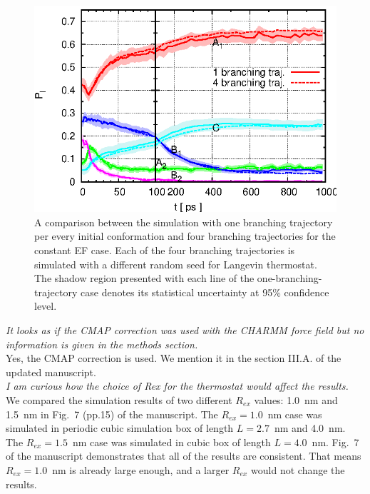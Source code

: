 \documentclass[]{revtex4-1}
\begin{document}
\begin{figure}
  \centering
  \includegraphics{figs/fig-meta-more.eps}
  \caption{A comparison between the simulation with one branching
    trajectory per every initial conformation and four branching
    trajectories  for the
    constant EF case. Each of the four
    branching trajectories is simulated with a different random seed for
    Langevin thermostat.
    The shadow region presented with each line of the one-branching-trajectory case
    denotes its statistical uncertainty at 95\% confidence level.  }
  \label{fig:tmp2}
\end{figure}

\emph{ It looks as if the CMAP correction was used with the CHARMM
  force field but no information is given in the methods section.}\\

Yes, the CMAP correction is used. We mention it in the
section III.A. of the updated manuscript.
\\

\emph{
I am curious how the choice of Rex for the thermostat would affect the
results.
}\\

We compared the simulation results of two different $R_{ex}$ values:
1.0~nm and 1.5~nm in Fig.~7 (pp.15) of the manuscript. The
$R_{ex}=1.0$~nm case was simulated in periodic cubic simulation box
of length $L=2.7$~nm and 4.0~nm.  The $R_{ex}=1.5$~nm case was
simulated in cubic box of length $L=4.0$~nm. Fig.~7 of the
manuscript demonstrates that all of the results are consistent. That
means $R_{ex}=1.0$~nm is already large enough, and a larger $R_{ex}$
would not change the results.\\
\end{document}
